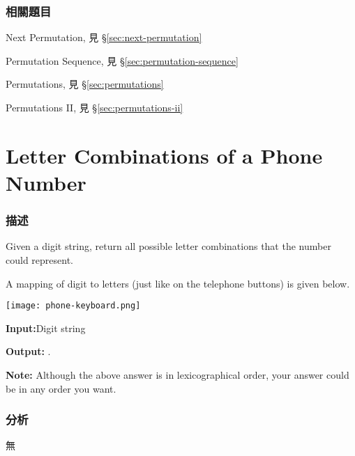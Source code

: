 \subsubsection{相關題目}
\begindot
\item Next Permutation, 見 \S \ref{sec:next-permutation}
\item Permutation Sequence, 見 \S \ref{sec:permutation-sequence}
\item Permutations, 見 \S \ref{sec:permutations}
\item Permutations II, 見 \S \ref{sec:permutations-ii}
\myenddot


\section{Letter Combinations of a Phone Number } %
\label{sec:letter-combinations-of-a-phone-number }


\subsubsection{描述}
Given a digit string, return all possible letter combinations that the number could represent.

A mapping of digit to letters (just like on the telephone buttons) is given below.

\begin{center}
\texttt{[image: phone-keyboard.png]}\\
\label{fig:phone-keyboard}
\end{center}

\textbf{Input:}Digit string 

\textbf{Output:} \code{\["ad", "ae", "af", "bd", "be", "bf", "cd", "ce", "cf"\]}.

\textbf{Note:}
Although the above answer is in lexicographical order, your answer could be in any order you want.


\subsubsection{分析}
無


